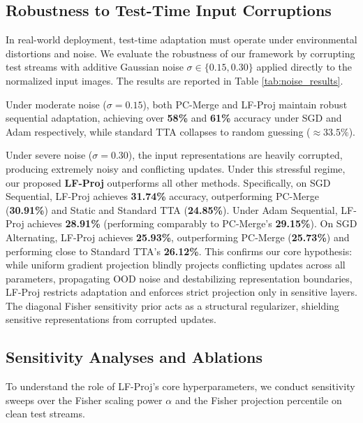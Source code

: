 \documentclass{article}
\theoremstyle{plain}
\theoremstyle{definition}
\theoremstyle{remark}
\begin{document}
\subsection{Robustness to Test-Time Input Corruptions}
In real-world deployment, test-time adaptation must operate under environmental distortions and noise. We evaluate the robustness of our framework by corrupting test streams with additive Gaussian noise $\sigma \in \{0.15, 0.30\}$ applied directly to the normalized input images. The results are reported in Table \ref{tab:noise_results}.

Under moderate noise ($\sigma = 0.15$), both PC-Merge and LF-Proj maintain robust sequential adaptation, achieving over \textbf{58\%} and \textbf{61\%} accuracy under SGD and Adam respectively, while standard TTA collapses to random guessing ($\approx 33.5\%$).

Under severe noise ($\sigma = 0.30$), the input representations are heavily corrupted, producing extremely noisy and conflicting updates. Under this stressful regime, our proposed \textbf{LF-Proj} outperforms all other methods. Specifically, on SGD Sequential, LF-Proj achieves \textbf{31.74\%} accuracy, outperforming PC-Merge (\textbf{30.91\%}) and Static and Standard TTA (\textbf{24.85\%}). Under Adam Sequential, LF-Proj achieves \textbf{28.91\%} (performing comparably to PC-Merge's \textbf{29.15\%}). On SGD Alternating, LF-Proj achieves \textbf{25.93\%}, outperforming PC-Merge (\textbf{25.73\%}) and performing close to Standard TTA's \textbf{26.12\%}. This confirms our core hypothesis: while uniform gradient projection blindly projects conflicting updates across all parameters, propagating OOD noise and destabilizing representation boundaries, LF-Proj restricts adaptation and enforces strict projection only in sensitive layers. The diagonal Fisher sensitivity prior acts as a structural regularizer, shielding sensitive representations from corrupted updates.

\subsection{Sensitivity Analyses and Ablations}
To understand the role of LF-Proj's core hyperparameters, we conduct sensitivity sweeps over the Fisher scaling power $\alpha$ and the Fisher projection percentile on clean test streams.
\end{document}
